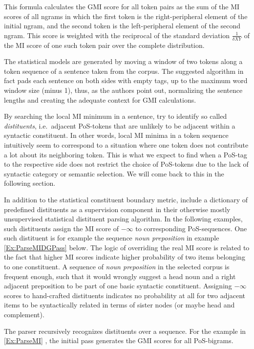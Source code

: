 \documentclass[11pt,a4paper,english]{article}
\begin{document}
This formula calculates the GMI score for all token pairs as the sum of the MI scores of all ngrams in which the first token is the right-peripheral element of the initial ngram, and the second token is the left-peripheral element of the second ngram. This score is weighted with the reciprocal of the standard deviation $\frac{1}{\delta{}XY}$ of the MI score of one such token pair over the complete distribution.

The statistical models are generated by moving a window of two tokens along a token sequence of a sentence taken from the corpus. The suggested algorithm in fact pads each sentence on both sides with empty tags, up to the maximum word window size (minus 1), thus, as the authors point out, normalizing the sentence lengths and creating the adequate context for GMI calculations.

By searching the local MI minimum in a sentence, \cite{Magerman:Marcus:1990} try to identify so called \textit{distituents}, i.e.\ adjacent PoS-tokens that are unlikely to be adjacent within a syntactic constituent. In other words, local MI minima in a token sequence intuitively seem to correspond to a situation where one token does not contribute a lot about its neighboring token. This is what we expect to find when a PoS-tag to the respective side does not restrict the choice of PoS-tokens due to the lack of syntactic category or semantic selection. We will come back to this in the following section.

In addition to the statistical constituent boundary metric, \cite{Magerman:Marcus:1990} include a dictionary of predefined distituents as a supervision component in their otherwise mostly unsupervised statistical distituent parsing algorithm. In the following examples, such distituents assign the MI score of $-\infty$ to corresponding PoS-sequences. One such distituent is for example the sequence \textit{noun preposition} in example \ref{Ex:ParseMIDGPass} below. The logic of overriding the real MI score is related to the fact that higher MI scores indicate higher probability of two items belonging to one constituent. A sequence of \textit{noun preposition} in the selected corpus is frequent enough, such that it would wrongly suggest a head noun and a right adjacent preposition to be part of one basic syntactic constituent. Assigning $-\infty$ scores to hand-crafted distituents indicates no probability at all for two adjacent items to be syntactically related in terms of sister nodes (or maybe head and complement).

The parser recursively recognizes distituents over a sequence. For the example in \ref{Ex:ParseMI} \cite[][pg.\ 987]{Magerman:Marcus:1990}, the initial pass generates the GMI scores for all PoS-bigrams.
\end{document}
